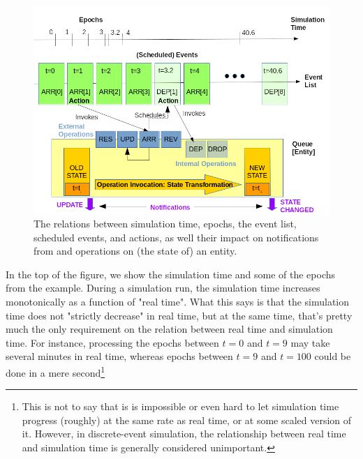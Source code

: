 \begin{figure}[h]
	\label{fig:SimpleSimulationOverview}
	\caption{The relations between simulation time, epochs,
		the event list, scheduled events, and actions,
		as well their impact on notifications from
		and operations on
		(the state of) an entity.}
	\includegraphics[width=\textwidth]{fig/SimpleSimulationOverview}
\end{figure}

In the top of the figure,
we show the simulation time and some of the epochs
from the example.
During a simulation run, the simulation time increases monotonically
as a function of "real time".
What this says is that the simulation time does not
"strictly decrease" in real time,
but at the same time,
that's pretty much the only requirement
on the relation between real time
and simulation time.
For instance,
processing the epochs between $t=0$ and $t=9$
may take several minutes in real time,
whereas epochs between $t=9$ and $t=100$
could be done in a mere second\footnote{
	This is not to say that is is impossible or even hard
	to let simulation time progress
	(roughly) at the same rate as real time,
	or at some scaled version of it.
	However, in discrete-event simulation,
	the relationship between real time and simulation time
	is generally considered unimportant.}

